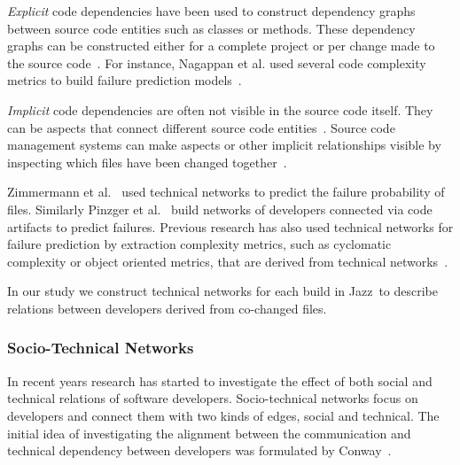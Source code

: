 \documentclass{sig-alternate}
\begin{document}
\emph{Explicit} code dependencies have been used to construct dependency graphs
between source code entities such as classes or methods. These dependency graphs can be constructed either for a complete project or per change made to the source code~\cite{german:ist:2009}.
For instance, Nagappan et al. used several code complexity metrics to build failure prediction models~\cite{nagappan:icse:2006}.

\emph{Implicit} code dependencies are often not visible in the source code
itself. They can be aspects that connect different source code
entities~\cite{tarr:icse:1999}. Source code management systems can make aspects
or other implicit relationships visible by inspecting which files have been
changed together~\cite{nagappan:icse:2005}. 

Zimmermann et
al.~\cite{zimmermann:icse:2008,zimmermann:issre:2007} used technical networks to predict the failure probability of files. Similarly Pinzger et al.~\cite{pinzger:fse:2008} build networks of developers connected via code artifacts to predict failures.
Previous research has also used technical networks for failure prediction by
extraction complexity metrics, such as cyclomatic complexity or object oriented metrics, that are derived from technical networks~\cite{nagappan:icse:2006}.


In our study we construct technical networks for each build in
Jazz\texttrademark\ to describe relations between developers  derived from
co-changed files.

\subsubsection{Socio-Technical Networks}
In recent years research has started to investigate the effect of both social
and technical relations of software developers. Socio-technical networks focus on
developers and connect them with two kinds of edges, social and technical. The
initial idea of investigating the alignment between the communication and
technical dependency between developers was formulated by
Conway~\cite{conway:datamination:1968}.
\end{document}
